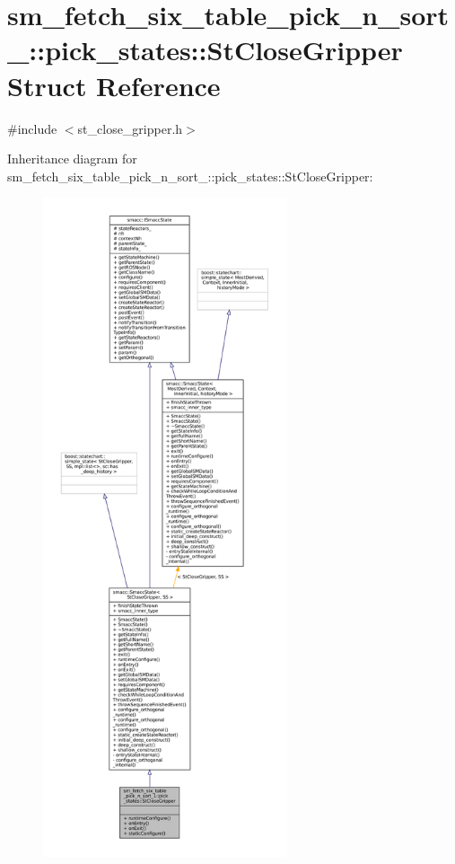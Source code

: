 \hypertarget{structsm__fetch__six__table__pick__n__sort__1_1_1pick__states_1_1StCloseGripper}{}\section{sm\+\_\+fetch\+\_\+six\+\_\+table\+\_\+pick\+\_\+n\+\_\+sort\+\_\+:\+:pick\+\_\+states\+:\+:St\+Close\+Gripper Struct Reference}
\label{structsm__fetch__six__table__pick__n__sort__1_1_1pick__states_1_1StCloseGripper}


{\ttfamily \#include $<$st\+\_\+close\+\_\+gripper.\+h$>$}



Inheritance diagram for sm\+\_\+fetch\+\_\+six\+\_\+table\+\_\+pick\+\_\+n\+\_\+sort\+\_\+:\+:pick\+\_\+states\+:\+:St\+Close\+Gripper\+:
\nopagebreak
\begin{figure}[H]
\begin{center}
\leavevmode
\includegraphics[height=550pt]{structsm__fetch__six__table__pick__n__sort__1_1_1pick__states_1_1StCloseGripper__inherit__graph}
\end{center}
\end{figure}


